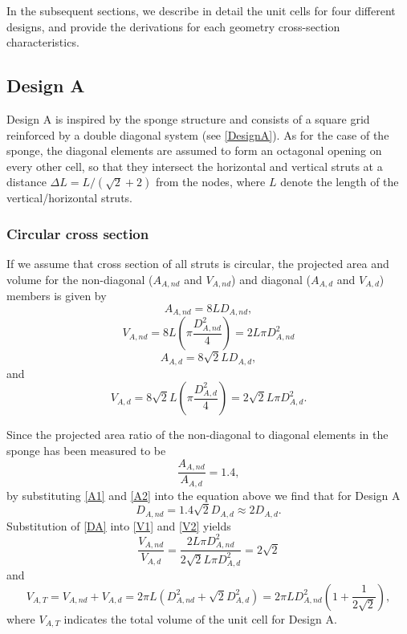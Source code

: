\documentclass[10pt,twoside]{fernandes_supp}
\begin{document}
In the subsequent sections, we describe in detail the unit cells for four different designs, and provide the derivations for each geometry cross-section characteristics. 

\subsection{Design A}
Design A is inspired by the sponge structure and consists of a square grid  reinforced by a double diagonal system (see \cref{DesignA}). As for the case of the sponge, the diagonal elements are assumed to form an octagonal opening on every other cell, so that they  intersect the horizontal and vertical struts at a distance $\Delta L=L/(\sqrt{2}+2)$ from the nodes, where $L$ denote the length of the vertical/horizontal struts. 
\subsubsection{Circular cross section} 
If we assume that cross section of all struts is circular, the projected area and volume for the non-diagonal ($A_{A,nd}$ and $V_{A,nd}$) and diagonal ($A_{A,d}$ and $V_{A,d}$) members is given by
\begin{equation}\label{A1}
A_{A,nd}=8 L D_{A,nd},
\end{equation}
\begin{equation}\label{V1}
V_{A,nd}=8 L \left(\pi\frac{D^2_{A,nd}}{4}\right)=2 L \pi D^2_{A,nd}
\end{equation}
\begin{equation}\label{A2}
A_{A,d}=8\sqrt{2} L D_{A,d},
\end{equation}
and
\begin{equation}\label{V2}
V_{A,d}=8 \sqrt{2} L\left(\pi\frac{D^2_{A,d}}{4}\right)=2\sqrt{2}L \pi D^2_{A,d}.
\end{equation}

 Since the projected area ratio of the non-diagonal to diagonal elements in the sponge has been measured to be 
\begin{equation}
\frac{A_{A,nd}}{A_{A,d}}=1.4,
\end{equation}
by substituting \cref{A1} and \cref{A2} into the equation above we find that for Design A
\begin{equation} \label{DA}
D_{A,nd}=1.4\sqrt{2}D_{A,d}\approx 2 D_{A,d}.
\end{equation}
Substitution of \cref{DA} into \cref{V1} and \cref{V2} yields 
\begin{equation}
\frac{V_{A,nd}}{V_{A,d}}=\frac{2 L \pi D^2_{A,nd}}{2\sqrt{2}L \pi D^2_{A,d}}=2\sqrt{2}
\end{equation}
and
\begin{equation}\label{VT}
V_{A,T}=V_{A,nd}+V_{A,d}=2\pi L (D_{A,nd}^2+\sqrt{2} D_{A,d}^2)=2\pi L D_{A,nd}^2 \left(1+\frac{1}{2\sqrt{2}}\right),
\end{equation}
where $V_{A,T}$ indicates the total volume of the unit cell for Design A. 
\end{document}

